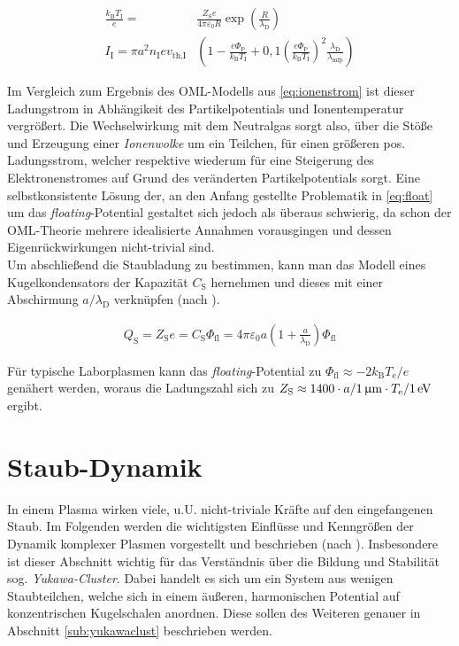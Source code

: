 \documentclass[numbers=noenddot,a4paper,notitlepage,twoside,BCOR15mm]{scrbook}
\newcommand{\ix}[1]{_\text{#1}}
\newcommand{\tilt}[1]{\textit{#1}}
\begin{document}
				\begin{align}
					\frac{k\ix{B}T\ix{I}}{e}=&\frac{Z\ix{S}e}{4\pi\varepsilon\ix{0}R}\exp\left(\frac{R}{\lambda\ix{D}}\right) \label{eq:bestimmR} \\
					I\ix{I}=\pi a^{2} n\ix{I}e v\ix{th,I}&\left(1-\frac{e\Phi\ix{P}}{k\ix{B}T\ix{I}}+0,1\left(\frac{e\Phi\ix{P}}{k\ix{B}T\ix{I}}\right)^{2}\frac{\lambda\ix{D}}{\lambda\ix{mfp}}\right) \label{eq:ionstromkorr}
				\end{align}

			Im Vergleich zum Ergebnis des OML-Modells aus \autoref{eq:ionenstrom} ist dieser Ladungstrom in Abh\"angikeit des Partikelpotentials und Ionentemperatur vergr\"o{\ss}ert. Die Wechselwirkung mit dem Neutralgas sorgt also, \"uber die St\"o{\ss}e und Erzeugung einer \tilt{Ionenwolke} um ein Teilchen, f\"ur einen gr\"o{\ss}eren pos. Ladungsstrom, welcher respektive wiederum f\"ur eine Steigerung des Elektronenstromes auf Grund des ver\"anderten Partikelpotentials sorgt. Eine selbstkonsistente L\"osung der, an den Anfang gestellte Problematik in \autoref{eq:float} um das \tilt{floating}-Potential gestaltet sich jedoch als \"uberaus schwierig, da schon der OML-Theorie mehrere idealisierte Annahmen vorausgingen und dessen Eigenr\"uckwirkungen nicht-trivial sind.\\
			Um abschließend die Staubladung zu bestimmen, kann man das Modell eines Kugelkondensators der Kapazität $C\ix{S}$ hernehmen und dieses mit einer Abschirmung $a/\lambda\ix{D}$ verknüpfen (nach \cite{Melzer12}).

				\begin{align}
					Q\ix{S}=Z\ix{S}e=C\ix{S}\Phi\ix{fl}=4\pi\varepsilon\ix{0}a\left(1+\frac{a}{\lambda\ix{D}}\right)\Phi\ix{fl} \label{eq:ladung}
				\end{align}

			Für typische Laborplasmen kann das \tilt{floating}-Potential zu $\Phi\ix{fl}\approx-2k\ix{B}T\ix{e}/e$ genähert werden, woraus die Ladungszahl sich zu $Z\ix{S}\approx1400\cdot a/\unit[1]{\upmu m}\cdot T\ix{e}/\unit[1]{eV}$ ergibt.

		\section{Staub-Dynamik}\label{sub:dynamik}

			In einem Plasma wirken viele, u.U. nicht-triviale Kräfte auf den eingefangenen Staub. Im Folgenden werden die wichtigsten Einflüsse und Kenngrößen der Dynamik komplexer Plasmen vorgestellt und beschrieben (nach \cite{Melzer10}). Insbesondere ist dieser Abschnitt wichtig für das Verständnis über die Bildung und Stabilität sog. \tilt{Yukawa-Cluster}. Dabei handelt es sich um ein System aus wenigen Staubteilchen, welche sich in einem äußeren, harmonischen Potential auf konzentrischen Kugelschalen anordnen. Diese sollen des Weiteren genauer in Abschnitt \ref{sub:yukawaclust} beschrieben werden.
\end{document}
